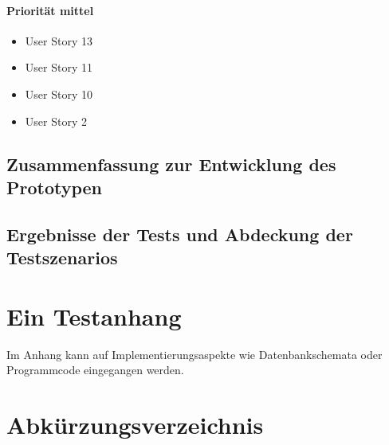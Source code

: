 \documentclass[listof=totocnumbered, bibliography=totocnumbered]{scrreprt}
\begin{document}
  \subsubsection{Priorität mittel}
  
  \begin{itemize}
    \item User Story 13
    \item User Story 11
    \item User Story 10
    \item User Story 2
  \end{itemize}
  
  
  \newpage
  
  \section{Zusammenfassung zur Entwicklung des Prototypen}
  
  
  \newpage
  
  \section{Ergebnisse der Tests und Abdeckung der Testszenarios}
  
  
  
  \appendix
  
  \chapter{Ein Testanhang}
  
  Im Anhang kann auf Implementierungsaspekte wie Datenbankschemata
  oder Programmcode eingegangen werden.
  
  
  \chapter{Abkürzungsverzeichnis}
  \begin{acronym}
    \setlength{\itemsep}{-\parsep}
  \end{acronym}
  
\end{document}
